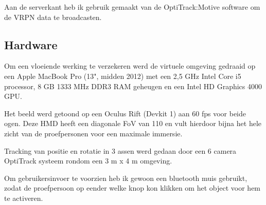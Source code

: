 Aan de serverkant heb ik gebruik gemaakt van de OptiTrack:Motive software om de
VRPN data te broadcasten.

\subsection{Hardware}
Om een vloeiende werking te verzekeren werd de virtuele omgeving gedraaid op een
Apple MacBook Pro (13", midden 2012) met een 2,5 GHz Intel Core i5 processor, 
8 GB 1333 MHz DDR3 RAM geheugen en een Intel HD Graphics 4000 GPU.

Het beeld werd getoond op een Oculus Rift (Devkit 1) aan 60 fps voor beide ogen.
Deze HMD heeft een diagonale FoV van 110\textdegree{} en vult hierdoor bijna het
hele zicht van de proefpersonen voor een maximale immersie.

Tracking van positie en rotatie in 3 assen werd gedaan door een 6 camera
OptiTrack systeem rondom een 3 m x 4 m omgeving.

Om gebruikersinvoer te voorzien heb ik gewoon een bluetooth muis gebruikt, zodat
de proefpersoon op eender welke knop kon klikken om het object voor hem te
activeren.